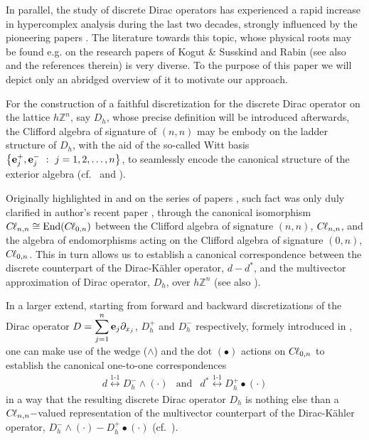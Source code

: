 \documentclass{elsarticle}
\newcommand{\BZ}{{\mathbb Z}}
\newcommand{\e}{{\bf e}}
\newcommand{\cl}{C \kern -0.1em \ell}
\begin{document}
In parallel, the study of discrete Dirac operators has experienced a rapid increase in hypercomplex analysis during the last two decades, strongly influenced by the pioneering papers \cite{faustino2006difference,FK07,FKS07,BSSV08,RSKS10}.
The literature towards this topic, whose physical roots may be found e.g. on the research papers of Kogut \& Susskind \cite{KS75} and Rabin \cite{Rabin82} (see also \cite{KK04,Sushch14} and the references therein) is very diverse. To the purpose of this paper we will depict only an abridged overview of it to motivate our approach.

For the construction of a faithful discretization for the discrete Dirac operator on the lattice $h\BZ^n$, say  $D_h$, whose precise definition will be introduced afterwards, the Clifford algebra of signature of $(n,n)$ may be embody on the ladder structure of $D_h$, with the aid of the so-called Witt basis $\left\{\e_j^+,\e_j^-~:~j=1,2,\ldots,n\right\}$, to seamlessly encode the canonical structure of the exterior algebra (cf.~\cite[Chapter 1]{gurlebeck1997quaternionic} and \cite[Chapter 2]{VR16}).

Originally highlighted in \cite{FKS07} and on the series of papers \cite{BSSV08,RSKS10}, such fact was only duly clarified in author's recent paper \cite{FaustinoKGordonDirac16}, through the canonical isomorphism $\cl_{n,n}\cong \mbox{End}(\cl_{0,n})$ between the Clifford algebra of signature $(n,n)$, $\cl_{n,n}$, and the algebra of endomorphisms acting on the Clifford algebra of signature $(0,n)$, $\cl_{0,n}$. 
This in turn allows us to establish a canonical correspondence between the discrete counterpart of the Dirac-K\"ahler operator, $d-d^*$, and the multivector approximation of Dirac operator, $D_h$, over $h\BZ^n$ (see also \cite{FaustinoMMAS17}). 

In a larger extend, 
starting from forward and backward discretizations of the Dirac operator $\displaystyle D=\sum_{j=1}^{n}\e_j\partial_{x_j}$, $D_h^+$ and $D_h^-$ respectively, formely introduced in \cite{FK07}, one can make use of the wedge ($\wedge$) and the dot $(\bullet)$ actions on $\cl_{0,n}$ to establish the canonical one-to-one correspondences
\begin{eqnarray*}
	d\overset{\text{1-1}} \longleftrightarrow D_h^- \wedge (\cdot) & \mbox{and}& d^* \overset{\text{1-1}} \longleftrightarrow D_h^+ \bullet (\cdot)
\end{eqnarray*}
in a way that the resulting discrete Dirac operator $D_{h}
$ is nothing else than a $\cl_{n,n}-$valued representation of the multivector counterpart 
of the Dirac-K\"ahler operator, $\displaystyle D_h^- \wedge (\cdot) -D_h^+ \bullet (\cdot)$ (cf.~\cite[Subsection 2.3]{FaustinoKGordonDirac16}).
\end{document}
